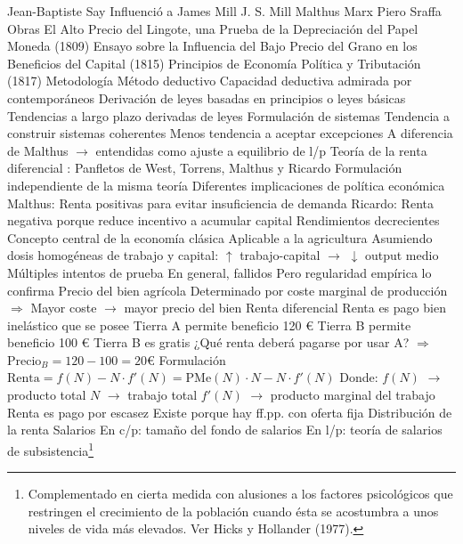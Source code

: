 \documentclass{nuevotema}
\begin{document}
\begin{esquemal}
				\4 Jean-Baptiste Say
			\3 Influenció a
				\4 James Mill
				\4 J. S. Mill
				\4 Malthus
				\4 Marx
				\4 Piero Sraffa
			\3 Obras
				\4 El Alto Precio del Lingote, una Prueba de la Depreciación del Papel Moneda (1809)
				\4 Ensayo sobre la Influencia del Bajo Precio del Grano en los Beneficios del Capital (1815)
				\4 Principios de Economía Política y Tributación (1817)
		\2 Metodología
			\3 Método deductivo
				\4 Capacidad deductiva admirada por contemporáneos
				\4 Derivación de leyes basadas en principios o leyes básicas
				\4 Tendencias a largo plazo derivadas de leyes
			\3 Formulación de sistemas
				\4 Tendencia a construir sistemas coherentes
				\4 Menos tendencia a aceptar excepciones
				\4[] A diferencia de Malthus
				\4[] $\to$ entendidas como ajuste a equilibrio de l/p
		\2 Teoría de la renta diferencial
			: Panfletos de West, Torrens, Malthus y Ricardo
				\4 Formulación independiente de la misma teoría
				\4 Diferentes implicaciones de política económica
				\4 Malthus:
				\4[] Renta positivas para evitar insuficiencia de demanda
				\4 Ricardo:
				\4[] Renta negativa porque reduce incentivo a acumular capital
			\3 Rendimientos decrecientes
				\4 Concepto central de la economía clásica
				\4 Aplicable a la agricultura
				\4 Asumiendo dosis homogéneas de trabajo y capital:
				\4[] $\uparrow$ trabajo-capital $\to$ $\downarrow$ output medio
				\4 Múltiples intentos de prueba
				\4[] En general, fallidos
				\4[] Pero regularidad empírica lo confirma
				\4 Precio del bien agrícola
				\4[] Determinado por coste marginal de producción
				\4[] $\Rightarrow$ Mayor coste $\to$ mayor precio del bien
			\3 Renta diferencial
				\4 Renta es pago bien inelástico que se posee
				\4[] Tierra A permite beneficio 120 €
				\4[] Tierra B permite beneficio 100 €
				\4[] Tierra B es gratis
				\4[] ¿Qué renta deberá pagarse por usar A?
				\4[] $\Rightarrow$ $\textrm{Precio}_B = 120 - 100 = 20 \textrm{€}$
				\4 Formulación
				\4[] $\textrm{Renta} = f(N) - N\cdot f'(N) = \textrm{PMe}(N)\cdot N - N \cdot f'(N)$
				\4[] Donde:
				\4[] $f(N)$ $\to$ producto total
				\4[] $N$ $\to$ trabajo total
				\4[] $f'(N)$ $\to$ producto marginal del trabajo
				\4[] 
				\4[$\then$] Renta es pago por escasez
				\4[] Existe porque hay ff.pp. con oferta fija
			\3 Distribución de la renta
				\4 Salarios
				\4[] En c/p: tamaño del fondo de salarios
				\4[] En l/p: teoría de salarios de subsistencia\footnote{Complementado en cierta medida con alusiones a los factores psicológicos que restringen el crecimiento de la población cuando ésta se acostumbra a unos niveles de vida más elevados. Ver Hicks y Hollander (1977).}

\end{esquemal}
\end{document}
